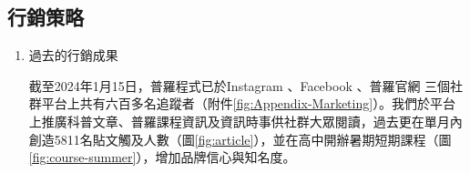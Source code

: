 \subsection{行銷策略}

\begin{enumerate}[label=(\arabic*)]
  \setlength{\parindent}{2em}
  \item 過去的行銷成果
    \par 截至2024年1月15日，普羅程式已於Instagram
    、Facebook
    、普羅官網
    三個社群平台上共有六百多名追蹤者（附件\ref{fig:Appendix-Marketing}）。我們於平台上推廣科普文章、普羅課程資訊及資訊時事供社群大眾閱讀，過去更在單月內創造5811名貼文觸及人數（圖\ref{fig:article}），並在高中開辦暑期短期課程（圖\ref{fig:course-summer}），增加品牌信心與知名度。
    
    

\end{enumerate}
